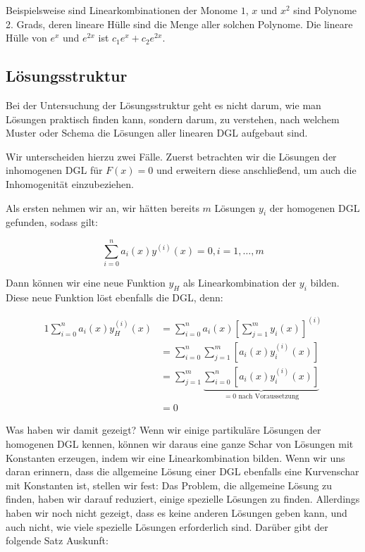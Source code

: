 Beispielsweise sind Linearkombinationen der Monome $1$, $x$ und $x^2$ sind Polynome 2. Grads, deren lineare Hülle sind die Menge aller solchen Polynome. Die lineare Hülle von $e^x$ und $e^{2x}$ ist $c_1 e^x + c_2 e^{2x}$.

\subsection{Lösungsstruktur}

Bei der Untersuchung der Lösungsstruktur geht es nicht darum, wie man Lösungen praktisch finden kann, sondern darum, zu verstehen, nach welchem Muster oder Schema die Lösungen aller linearen DGL aufgebaut sind.

Wir unterscheiden hierzu zwei Fälle. Zuerst betrachten wir die Lösungen der inhomogenen DGL für $F(x) = 0$ und erweitern diese anschließend, um auch die Inhomogenität einzubeziehen.

Als ersten nehmen wir an, wir hätten bereits $m$ Lösungen $y_i$ der homogenen DGL gefunden, sodass gilt:

$$
    \sum\limits_{i=0}^n a_i(x) y^{(i)}(x) = 0, i = 1,\dots,m
$$

Dann können wir eine neue Funktion $y_H$ als Linearkombination der $y_i$ bilden. Diese neue Funktion löst ebenfalls die DGL, denn:

\begin{alignat*}{1}
    \sum\limits_{i=0}^n a_i(x) y_H^{(i)}(x) &= \sum\limits_{i=0}^n a_i(x) \left[\sum\limits_{j=1}^m y_i(x)\right]^{(i)} \\
                                            &= \sum\limits_{i=0}^n \sum\limits_{j=1}^m \left[ a_i(x) y_i^{(i)}(x) \right] \\
                                            &= \sum\limits_{j=1}^m \underbrace{\sum\limits_{i=0}^n \left[ a_i(x) y_i^{(i)}(x) \right]}_{=0 \text{ nach Voraussetzung}} \\
                                            &= 0
\end{alignat*}

Was haben wir damit gezeigt? Wenn wir einige partikuläre Lösungen der homogenen DGL kennen, können wir daraus eine ganze Schar von Lösungen mit Konstanten erzeugen, indem wir eine Linearkombination bilden. Wenn wir uns daran erinnern, dass die allgemeine Lösung einer DGL ebenfalls eine Kurvenschar mit Konstanten ist, stellen wir fest: Das Problem, die allgemeine Lösung zu finden, haben wir darauf reduziert, einige spezielle Lösungen zu finden. Allerdings haben wir noch nicht gezeigt, dass es keine anderen Lösungen geben kann, und auch nicht, wie viele spezielle Lösungen erforderlich sind. Darüber gibt der folgende Satz Auskunft:

